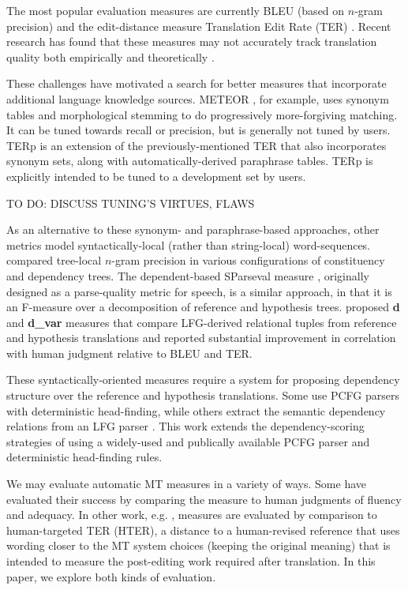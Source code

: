 \documentclass{kluwer}    %
\begin{document}
\begin{article}
The most popular evaluation measures are currently BLEU (based on
$n$-gram precision) and the edit-distance measure Translation Edit
Rate (TER) \cite{snover06ter}.  Recent research has found that these
measures may not accurately track translation quality both empirically
\cite{charniak03syntaxlmmt} and theoretically
\cite{callisonburch06bleuproblems}.

These challenges have motivated a search for better measures that
incorporate additional language knowledge sources.  METEOR
\cite{banerjee05meteor}, for example, uses synonym tables and
morphological stemming to do progressively more-forgiving matching.
It can be tuned towards recall or precision, but is generally not
tuned by users.  TERp \cite{snover09terp} is an extension of the
previously-mentioned TER that also incorporates synonym sets, along
with automatically-derived paraphrase tables.  TERp is explicitly
intended to be tuned to a development set by users.

TO DO: DISCUSS TUNING'S VIRTUES, FLAWS

As an alternative to these synonym- and paraphrase-based approaches,
other metrics model syntactically-local (rather than string-local)
word-sequences.  compared tree-local
$n$-gram precision in various configurations of constituency and
dependency trees.  The dependent-based SParseval measure
\cite{roark06:sparseval}, originally designed as a parse-quality
metric for speech, is a similar approach, in that it is an F-measure
over a decomposition of reference and hypothesis trees.
 proposed \textbf{d} and
\textbf{d\_var} measures that compare LFG-derived relational tuples
from reference and hypothesis translations and reported substantial
improvement in correlation with human judgment relative to BLEU and
TER.

These syntactically-oriented measures require a system for proposing
dependency structure over the reference and hypothesis
translations. Some \cite{liu05syntaxformteval,roark06:sparseval} use
PCFG parsers with deterministic head-finding, while others
\cite{owczarzak07labelleddepseval} extract the semantic dependency
relations from an LFG parser \cite{cahill04lfg}.
%
This work extends the dependency-scoring strategies of
 using a
widely-used and publically available PCFG parser and deterministic
head-finding rules.
 
We may evaluate automatic MT measures in a variety of ways. Some
\cite{banerjee05meteor,liu05syntaxformteval,owczarzak07labelleddepseval}
have evaluated their success by comparing the measure to human
judgments of fluency and adequacy.  In other work,
e.g. , measures are evaluated by comparison to
human-targeted TER (HTER), a distance to a human-revised reference
that uses wording closer to the MT system choices (keeping the
original meaning) that is intended to measure the post-editing work
required after translation.  In this paper, we explore both kinds of
evaluation.


\end{article}
\end{document}
